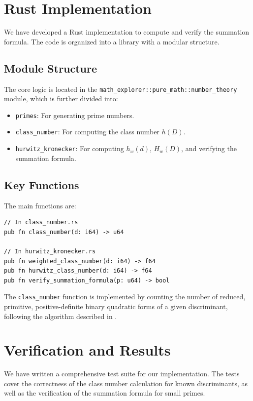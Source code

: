 \documentclass{article}
\begin{document}
\section{Rust Implementation}

We have developed a Rust implementation to compute and verify the summation formula. The code is organized into a library with a modular structure.

\subsection{Module Structure}

The core logic is located in the \texttt{math_explorer::pure_math::number_theory} module, which is further divided into:
\begin{itemize}
    \item \texttt{primes}: For generating prime numbers.
    \item \texttt{class\_number}: For computing the class number $h(D)$.
    \item \texttt{hurwitz\_kronecker}: For computing $h_w(d)$, $H_w(D)$, and verifying the summation formula.
\end{itemize}

\subsection{Key Functions}

The main functions are:

\begin{verbatim}
// In class_number.rs
pub fn class_number(d: i64) -> u64

// In hurwitz_kronecker.rs
pub fn weighted_class_number(d: i64) -> f64
pub fn hurwitz_class_number(d: i64) -> f64
pub fn verify_summation_formula(p: u64) -> bool
\end{verbatim}

The \texttt{class_number} function is implemented by counting the number of reduced, primitive, positive-definite binary quadratic forms of a given discriminant, following the algorithm described in \cite{cohen1993course}.

\section{Verification and Results}

We have written a comprehensive test suite for our implementation. The tests cover the correctness of the class number calculation for known discriminants, as well as the verification of the summation formula for small primes.
\end{document}
